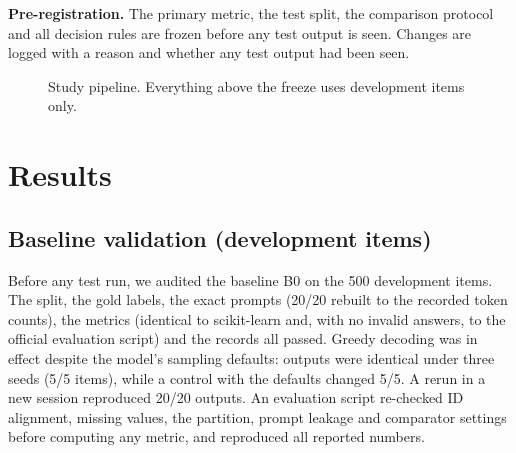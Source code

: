 \documentclass[conference]{IEEEtran}
\newcommand{\Sp}{S_{\mathrm{prompt}}}
\begin{document}
\textbf{Pre-registration.} The primary metric, the test split, the
comparison protocol and all decision rules are frozen before any test
output is seen. Changes are logged with a reason and whether any test
output had been seen.

\begin{figure}[t]
\centering
{}
\caption{Study pipeline. Everything above the freeze uses development
items only.}
\label{fig:pipeline}
\end{figure}

\section{Results}
\label{sec:results}
\subsection{Baseline validation (development items)}
Before any test run, we audited the baseline B0 on the 500 development
items. The split, the gold labels, the exact prompts (20/20 rebuilt to the
recorded token counts), the metrics (identical to scikit-learn and, with
no invalid answers, to the official evaluation script) and the records all
passed. Greedy decoding was in effect despite the model's sampling
defaults: outputs were identical under three seeds (5/5 items), while a
control with the defaults changed 5/5. A rerun in a new session reproduced
20/20 outputs. An evaluation script re-checked ID alignment, missing
values, the partition, prompt leakage and comparator settings before
computing any metric, and reproduced all reported numbers.
\end{document}
